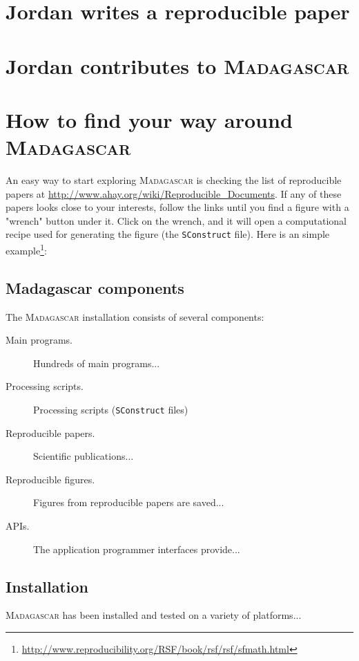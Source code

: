 \section{Jordan writes a reproducible paper}

\section{Jordan contributes to \textsc{Madagascar}}

\section{How to find your way around \textsc{Madagascar}}

An easy way to start exploring \textsc{Madagascar} is checking the
list of reproducible papers at
\url{http://www.ahay.org/wiki/Reproducible_Documents}.  If any of
these papers looks close to your interests, follow the links until you
find a figure with a "wrench" button under it. Click on the wrench,
and it will open a computational recipe used for generating the figure
(the \texttt{SConstruct} file). Here is an simple
example\footnote{\url{http://www.reproducibility.org/RSF/book/rsf/rsf/sfmath.html}}:

\subsection{Madagascar components}

The \textsc{Madagascar} installation consists of several components:
\begin{description}
\item[Main programs.] Hundreds of main programs...
\item[Processing scripts.] Processing scripts (\texttt{SConstruct} files)
\item[Reproducible papers.] Scientific publications...
\item[Reproducible figures.] Figures from reproducible papers are saved...
\item[APIs.] The application programmer interfaces provide...  
\end{description}

\subsection{Installation}

\textsc{Madagascar} has been installed and tested on a variety of platforms...

